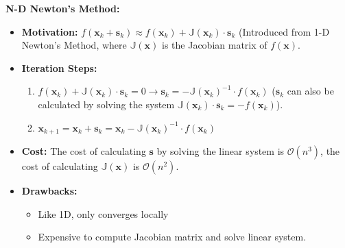 \documentclass[12pt]{article}
\begin{document}
\medskip
\noindent \textbf{N-D Newton's Method: }
\begin{itemize}
    \item \textbf{Motivation:} $f(\mathbf{x}_k + \mathbf{s}_k) \approx f(\mathbf{x}_k) + \mathbb{J}(\mathbf{x}_k) \cdot \mathbf{s}_k$ (Introduced from 1-D Newton's Method, where $\mathbb{J}(\mathbf{x})$ is the Jacobian matrix of $f(\mathbf{x})$.
    \item \textbf{Iteration Steps:}
        \begin{enumerate}
            \item $f(\mathbf{x}_k) + \mathbb{J}(\mathbf{x}_k) \cdot \mathbf{s}_k = 0 \to \mathbf{s}_k = - \mathbb{J}(\mathbf{x}_k)^{-1} \cdot f(\mathbf{x}_k)$ ($\mathbf{s}_k$ can also be calculated by solving the system $\mathbb{J}(\mathbf{x}_k) \cdot \mathbf{s}_k = -f(\mathbf{x}_k)$). 
            \item $\mathbf{x}_{k+1} = \mathbf{x}_k + \mathbf{s}_k = \mathbf{x}_k - \mathbb{J}(\mathbf{x}_k)^{-1} \cdot f(\mathbf{x}_k)$
        \end{enumerate}
    \item \textbf{Cost:} The cost of calculating $\mathbf{s}$ by solving the linear system is $\mathcal{O}(n^3)$, the cost of calculating $\mathbb{J}(\mathbf{x})$ is $\mathcal{O}(n^2)$.
    \item \textbf{Drawbacks:}
        \begin{itemize}
            \item Like 1D, only converges locally
            \item Expensive to compute Jacobian matrix and solve linear system.
        \end{itemize}
\end{itemize}
\end{document}
